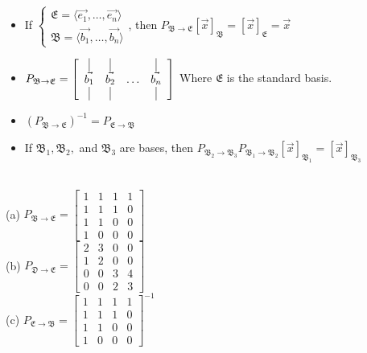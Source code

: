 \documentclass{report}
\begin{document}
\begin{note}
\begin{itemize}
\item If
$\left\{\begin{array}{l}
\mathfrak{E} = \langle \vec{e_1},\ldots,\vec{e_n} \rangle \\
\mathfrak{B} = \langle \vec{b_1},\ldots,\vec{b_n} \rangle
\end{array}
\right.$, then $P_{\mathfrak{B} \rightarrow \mathfrak{E}}[\vec{x}]_{\mathfrak{B}} = [\vec{x}]_{\mathfrak{E}} = \vec{x}$ \\
\item
$P_{\mathfrak{B} \rightarrow \mathfrak{E}} = 
\left[
  \begin{array}{cccc}
    \vrule & \vrule & & \vrule\\
    \vec{b_1} & \vec{b_2} & \ldots & \vec{b_n} \\
    \vrule & \vrule & & \vrule 
  \end{array}
\right]$ Where $\mathfrak{E}$ is the standard basis.
\item $(P_{\mathfrak{B} \rightarrow \mathfrak{E}})^{-1} = P_{\mathfrak{E}\rightarrow\mathfrak{B}}$
\item If $\mathfrak{B}_1,\mathfrak{B}_2,$ and $\mathfrak{B}_3$ are bases, then $P_{\mathfrak{B}_2\rightarrow\mathfrak{B}_3}P_{\mathfrak{B}_1\rightarrow\mathfrak{B}_2}[\vec{x}]_{\mathfrak{B}_1}=[\vec{x}]_{\mathfrak{B}_3}$
\end{itemize}
\end{note}
\sol \\
(a) $P_{\mathfrak{B} \rightarrow \mathfrak{E}} =
\begin{bmatrix}
1 & 1 & 1 & 1 \\
1 & 1 &1 & 0 \\
1 & 1 & 0 & 0 \\
1 & 0 & 0 & 0
\end{bmatrix} $ \\
\noindent
(b) $P_{\mathfrak{D} \rightarrow \mathfrak{E}} =
\begin{bmatrix}
2 & 3 & 0 & 0 \\
1 & 2 & 0 & 0 \\
0 & 0 & 3 & 4 \\
0 & 0 & 2 & 3
\end{bmatrix} $ \\
\noindent
(c) $P_{\mathfrak{E} \rightarrow \mathfrak{B}} =
\begin{bmatrix}
1 & 1 & 1 & 1 \\
1 & 1 &1 & 0 \\
1 & 1 & 0 & 0 \\
1 & 0 & 0 & 0
\end{bmatrix} ^{-1}$
\end{document}
